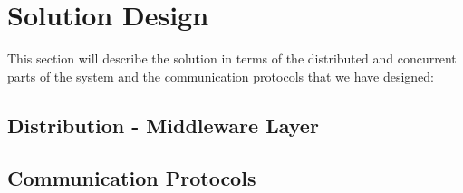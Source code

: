 \section{Solution Design}

This section will describe the solution in terms of the distributed and concurrent parts of the system and the communication protocols that we have designed:

\subsection{Distribution - Middleware Layer}



\subsection{Communication Protocols}

